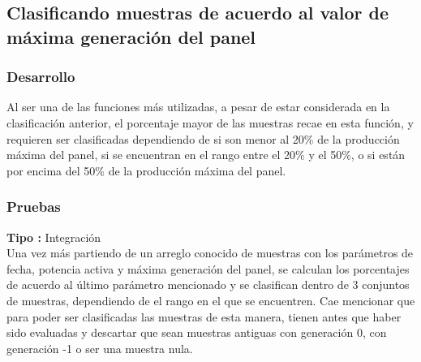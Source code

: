 \subsection{Clasificando muestras de acuerdo al valor de máxima generación del panel}

\subsubsection{Desarrollo}
Al ser una de las funciones más utilizadas, a pesar de estar considerada en la clasificación anterior, el porcentaje mayor de las muestras recae en esta función, y requieren ser clasificadas dependiendo de si son menor al 20\% de la producción máxima del panel, si se encuentran en el rango entre el 20\% y el 50\%, o si están por encima del 50\% de la producción máxima del panel. \\ \newline

\subsubsection{Pruebas}
\textbf{Tipo :} Integración \\ \newline
Una vez más partiendo de un arreglo conocido de muestras con los parámetros de fecha, potencia activa y máxima generación del panel, se calculan los porcentajes de acuerdo al último parámetro mencionado y se clasifican dentro de 3 conjuntos de muestras, dependiendo de el rango en el que se encuentren. Cae mencionar que para poder ser clasificadas las muestras de esta manera, tienen antes que haber sido evaluadas y descartar que sean muestras antiguas con generación 0, con generación -1 o ser una muestra nula. \\ \newline

